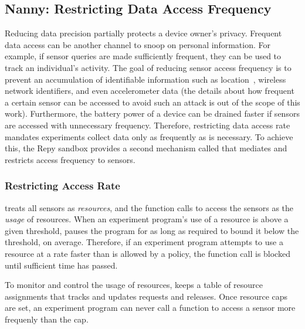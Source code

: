 \subsection{Nanny: Restricting Data Access Frequency}\label{sec-nanny}

Reducing data precision partially protects a device owner's privacy. Frequent data 
access can be another channel to snoop on personal information.
For example, if sensor queries are made sufficiently frequent, they can be used
to track an individual's activity. The goal of reducing sensor access frequency 
is to prevent an accumulation of identifiable information such as 
location~\cite{gruteser2003anonymous}, wireless network identifiers, and even 
accelerometer data (the 
details about how frequent a certain sensor can be accessed to avoid such an 
attack is out of the scope of this work). 
Furthermore, the battery power of a device can 
be drained faster if sensors are accessed
with unnecessary frequency. Therefore, restricting data access rate 
mandates experiments collect data only as frequently as is necessary. 
To achieve this, the Repy sandbox provides a second mechanism
called  that mediates and restricts access frequency to sensors. 

\subsubsection{Restricting Access Rate}

 treats all sensors as \textit{resources}, and the function calls to 
access the sensors as the \textit{usage} of resources. 
When an 
experiment program's use of a resource is above a given threshold, 
 pauses the 
program for as long as required to bound it below the
threshold, on average. Therefore, if an experiment program attempts to 
use a resource at a rate faster than is allowed by a policy, the function 
call is blocked until sufficient time has passed. 

To monitor and control the usage of resources,  keeps a 
table of resource assignments that tracks and updates requests and releases. 
Once resource caps are set, an experiment program can never call a 
function to access a sensor more frequenly than the cap. 

